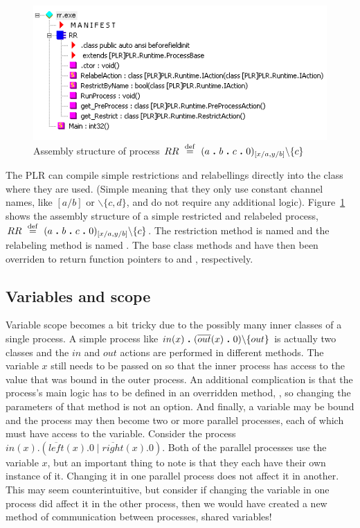 	\begin{figure}
		\begin{center}\includegraphics[scale=0.7]{ex_rr.png}\end{center}
		\caption{Assembly structure of process  $RR \ \stackrel{\mathrm{def}}{=}\  (a \ \textbf{.}\  b \ \textbf{.}\  c \ \textbf{.}\  0)_{[x/a,y/b]} \backslash \{ c \}$}
		\label{fig:struct_restrictrelabel}
	\end{figure}

	The PLR can compile simple restrictions and relabellings directly into the 
	class where they are used. (Simple meaning that they only use constant 
	channel names, like $[a/b]$ or $\backslash\{c,d\}$, and do not require any 
	additional logic). Figure~\ref{fig:struct_restrictrelabel} shows the 
	assembly structure of a simple restricted and relabeled process, $RR \ \stackrel{\mathrm{def}}{=}\  
	(a \ \textbf{.}\  b \ \textbf{.}\  c \ \textbf{.}\  0)_{[x/a,y/b]} \backslash \{ c \}$. The 
	restriction method is named  and the relabeling method 
	is named . The base class methods 
	 and  have then been overriden to 
	return function pointers to  and , 
	respectively.

	\subsection{Variables and scope}
	
	Variable scope becomes a bit tricky due to the possibly many inner classes
	of a single process. A simple process like $in(x) \ \textbf{.}\  (\overline{out}(x) 
	\ \textbf{.}\  0)\backslash\{out\}$ is actually two classes and the $in$ and $out$ 
	actions are performed in different methods. The variable $x$ still needs to 
	be passed on so that the inner process has access to the value that was 
	bound in the outer process. An additional complication is that the process's 
	main logic has to be defined in an overridden method, , so 
	changing the parameters of that method is not an option. And finally, a 
	variable may be bound and the process may then become two or more parallel 
	processes, each of which must have access to the variable. Consider the 
	process $in(x) . (\overline{left}(x) . 0 \mid \overline{right}(x).0)$. Both 
	of the parallel processes use the variable $x$, but an important thing to 
	note is that they each have their own instance of it. Changing it in one 
	parallel process does not affect it in another. This may seem 
	counterintuitive, but consider if changing the variable in one process did 
	affect it in the other process, then we would have created a new method of 
	communication between processes, shared variables!
	
